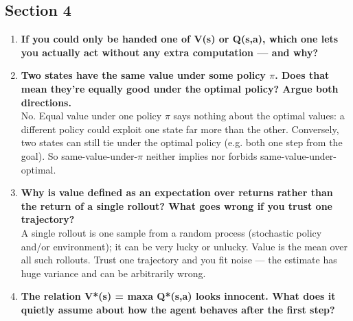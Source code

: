 \documentclass[11pt]{article}
\begin{document}
\subsection*{Section 4}
\begin{enumerate}[leftmargin=1.5em,itemsep=5pt]
\item \textbf{If you could only be handed one of V(s) or Q(s,a), which one lets you actually act without any extra computation --- and why?}\\[2pt]
\textcolor{ink2}{}
\item \textbf{Two states have the same value under some policy \ensuremath{\pi}. Does that mean they're equally good under the optimal policy? Argue both directions.}\\[2pt]
\textcolor{ink2}{No. Equal value under one policy \ensuremath{\pi} says nothing about the optimal values: a different policy could exploit one state far more than the other. Conversely, two states can still tie under the optimal policy (e.g. both one step from the goal). So same-value-under-\ensuremath{\pi} neither implies nor forbids same-value-under-optimal.}
\item \textbf{Why is value defined as an expectation over returns rather than the return of a single rollout? What goes wrong if you trust one trajectory?}\\[2pt]
\textcolor{ink2}{A single rollout is one sample from a random process (stochastic policy and/or environment); it can be very lucky or unlucky. Value is the mean over all such rollouts. Trust one trajectory and you fit noise --- the estimate has huge variance and can be arbitrarily wrong.}
\item \textbf{The relation V*(s) = maxa Q*(s,a) looks innocent. What does it quietly assume about how the agent behaves after the first step?}\\[2pt]
\textcolor{ink2}{}
\end{enumerate}
\end{document}
